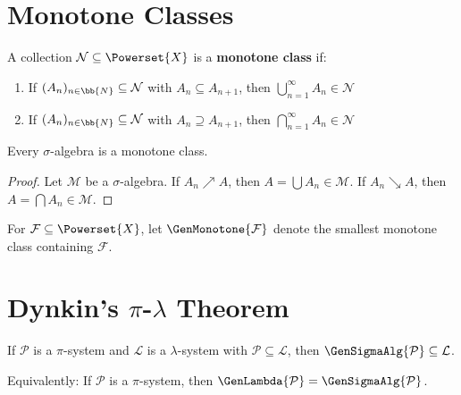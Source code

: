 \section{Monotone Classes}

\begin{definition}
A collection $\mathcal{N} \subseteq \Powerset{X}$ is a \textbf{monotone class} if:
\begin{enumerate}
    \item If $(A_n)_{n \in \bb{N}} \subseteq \mathcal{N}$ with $A_n \subseteq A_{n+1}$, then $\bigcup_{n=1}^{\infty} A_n \in \mathcal{N}$
    \item If $(A_n)_{n \in \bb{N}} \subseteq \mathcal{N}$ with $A_n \supseteq A_{n+1}$, then $\bigcap_{n=1}^{\infty} A_n \in \mathcal{N}$
\end{enumerate}
\end{definition}

\begin{proposition}
Every $\sigma$-algebra is a monotone class.
\end{proposition}

\begin{proof}
Let $\mathcal{M}$ be a $\sigma$-algebra. If $A_n \nearrow A$, then $A = \bigcup A_n \in \mathcal{M}$. If $A_n \searrow A$, then $A = \bigcap A_n \in \mathcal{M}$.
\end{proof}

\begin{definition}
For $\mathcal{F} \subseteq \Powerset{X}$, let $\GenMonotone{\mathcal{F}}$ denote the smallest monotone class containing $\mathcal{F}$.
\end{definition}

\section{Dynkin's $\pi$-$\lambda$ Theorem}

\begin{theorem}
If $\mathcal{P}$ is a $\pi$-system and $\mathcal{L}$ is a $\lambda$-system with $\mathcal{P} \subseteq \mathcal{L}$, then $\GenSigmaAlg{\mathcal{P}} \subseteq \mathcal{L}$.

Equivalently: If $\mathcal{P}$ is a $\pi$-system, then $\GenLambda{\mathcal{P}} = \GenSigmaAlg{\mathcal{P}}$.
\end{theorem}

